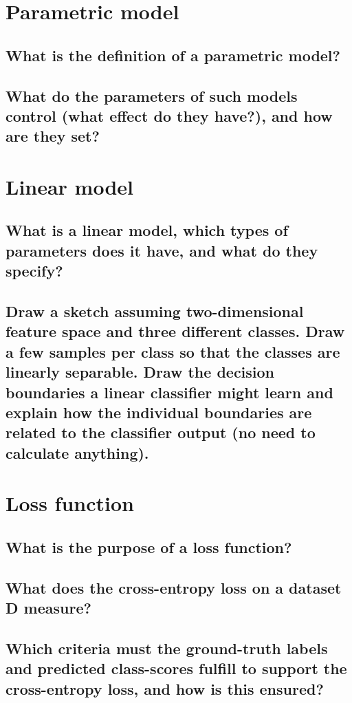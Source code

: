 \section{Parametric model}
\subsection{What is the definition of a parametric model?}
\subsection{What do the parameters of such models control (what effect do they have?), and how are they set?}

\section{Linear model}
\subsection{What is a linear model, which types of parameters does it have, and what do they specify?}
\subsection{Draw a sketch assuming two-dimensional feature space and three different classes. Draw a few samples per class so that the classes are linearly separable. Draw the decision boundaries a linear classifier might learn and explain how the individual boundaries are related to the classifier output (no need to calculate anything).}

\section{Loss function}
\subsection{What is the purpose of a loss function?}
\subsection{What does the cross-entropy loss on a dataset D measure?}
\subsection{Which criteria must the ground-truth labels and predicted class-scores fulfill to support the cross-entropy loss, and how is this ensured?}

